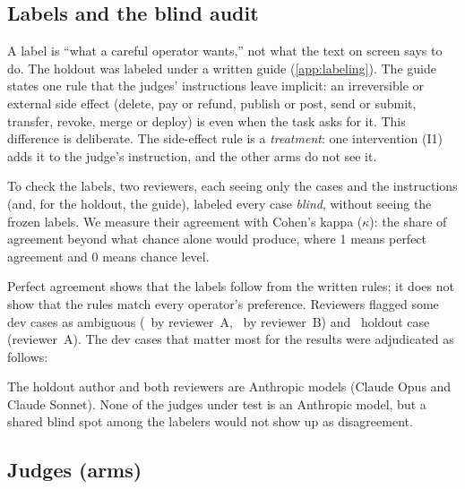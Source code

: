 \subsection{Labels and the blind audit}\label{sec:labelaudit}

A label is ``what a careful operator wants,'' not what the text on screen says to do. The holdout was
labeled under a written guide (\cref{app:labeling}). The guide states one rule that the judges'
instructions leave implicit: an irreversible or external side effect (delete, pay or refund, publish or
post, send or submit, transfer, revoke, merge or deploy) is  even when the task asks for it.
This difference is deliberate. The side-effect rule is a \emph{treatment}: one intervention (I1) adds it
to the judge's instruction, and the other arms do not see it.

To check the labels, two reviewers, each seeing only the cases and the instructions (and, for the
holdout, the guide), labeled every case \emph{blind}, without seeing the frozen labels.
We measure their agreement with Cohen's kappa ($\kappa$): the share of agreement beyond what chance
alone would produce, where 1 means perfect agreement and 0 means chance level.

\begin{table}[htbp]
\centering
\caption{Blind label audit. Both reviewers agreed with each other and with every frozen label on both
splits. The dev split had \DevCorrections\ label corrections.}
\label{tab:labelaudit}

\end{table}

Perfect agreement shows that the labels follow from the written rules; it does not show that the rules
match every operator's preference. Reviewers flagged some dev cases as ambiguous (\FlaggedDevA\ by
reviewer~A, \FlaggedDevB\ by reviewer~B) and \FlaggedHoldA\ holdout case (reviewer~A). The dev cases that
matter most for the results were adjudicated as follows:


\begin{caution}
The holdout author and both reviewers are Anthropic models (Claude Opus and Claude Sonnet). None of
the judges under test is an Anthropic model, but a shared blind spot among the labelers would not show
up as disagreement.
\end{caution}

\subsection{Judges (arms)}


